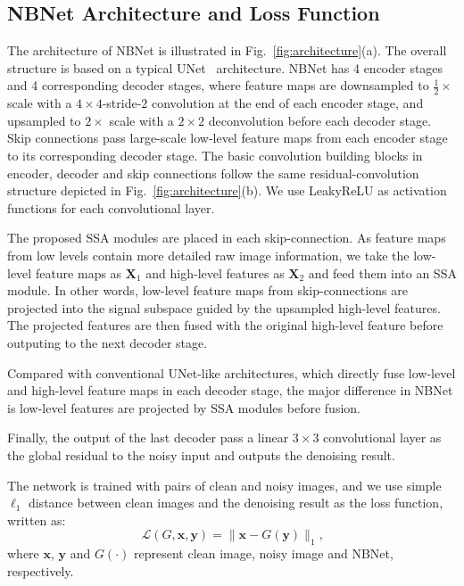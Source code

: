 \documentclass[final]{cvpr}
\newcommand{\bs}{\boldsymbol}
\newcommand{\Xa}{\bs{X}_{1}}
\newcommand{\Xb}{\bs{X}_{2}}
\begin{document}
\subsection{NBNet Architecture and Loss Function}

The architecture of NBNet is illustrated in Fig.~\ref{fig:architecture}(a). The overall structure
is based on a typical UNet~\cite{ronneberger2015u} architecture. NBNet has 4 encoder stages and 4 corresponding decoder stages, where feature maps
are downsampled to $\frac{1}{2}\times$ scale with a $4\times 4$-stride-$2$ convolution at the end of each encoder stage, and upsampled to $2\times$ scale with a $2\times 2$ deconvolution before each decoder stage. Skip connections pass large-scale low-level feature maps from each encoder stage to
its corresponding decoder stage. The basic convolution building blocks in encoder, decoder and skip connections follow the same residual-convolution structure depicted in Fig.~\ref{fig:architecture}(b).
We use LeakyReLU as activation functions for each convolutional layer.

The proposed SSA modules are placed in each skip-connection. As feature maps from low levels contain
more detailed raw image information, we take the low-level feature maps as $\Xa$ and high-level 
features as $\Xb$ and feed them into an SSA module. In other words, low-level feature maps from
skip-connections are projected into the signal subspace guided by the upsampled high-level features. The projected features are then fused with the original high-level feature before outputing to the next decoder stage.

Compared with conventional UNet-like architectures, which directly fuse low-level and 
high-level feature maps in each decoder stage, the major difference in NBNet is low-level features
are projected by SSA modules before fusion.

Finally, the output of the last decoder pass a linear $3\times 3$ convolutional layer as the global
residual to the noisy input and outputs the denoising result. 










The network is trained with pairs of clean and noisy images, and we use simple $\ell_1$ distance 
between clean images and the denoising result as the loss function, written as:
\begin{equation}
    \mathcal{L}(G, \bs{x}, \bs{y}) = \|\bs{x}-G(\bs{y})\|_1 \text{,}
\end{equation}
where $\bs{x}$, $\bs{y}$ and $G(\cdot)$ represent clean image, noisy image and NBNet, respectively.
\end{document}
